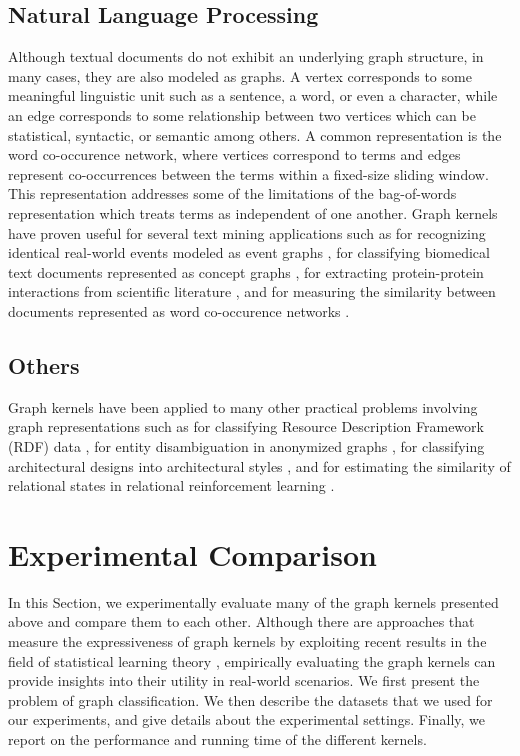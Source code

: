 \documentclass[twoside,11pt]{article}
\begin{document}
\subsection{Natural Language Processing}
Although textual documents do not exhibit an underlying graph structure, in many cases, they are also modeled as graphs.
A vertex corresponds to some meaningful linguistic unit such as a sentence, a word, or even a character, while an edge corresponds to some relationship between two vertices which can be statistical, syntactic, or semantic among others.
A common representation is the word co-occurence network, where vertices correspond to terms and edges represent co-occurrences between the terms within a fixed-size sliding window.
This representation addresses some of the limitations of the bag-of-words representation which treats terms as independent of one another.
Graph kernels have proven useful for several text mining applications such as for recognizing identical real-world events modeled as event graphs \cite{glavavs2013recognizing}, for classifying biomedical text documents represented as concept graphs \cite{bleik2013text}, for extracting protein-protein interactions from scientific literature \cite{airola2008graph,airola2008all}, and for measuring the similarity between documents represented as word co-occurence networks \cite{nikolentzos2017shortest}.


\subsection{Others}
Graph kernels have been applied to many other practical problems involving graph representations such as for classifying Resource Description Framework (RDF) data \cite{losch2012graph,de2015substructure}, for entity disambiguation in anonymized graphs \cite{hermansson2013entity}, for classifying architectural designs into architectural styles \cite{strobbe2016automatic}, and for estimating the similarity of relational states in relational reinforcement learning \cite{driessens2006graph,halbritter2007learning}.


\section{Experimental Comparison}\label{sec:experiments}
In this Section, we experimentally evaluate many of the graph kernels presented above and compare them to each other.
Although there are approaches that measure the expressiveness of graph kernels by exploiting recent results in the field of statistical learning theory \cite{oneto2017measuring}, empirically evaluating the graph kernels can provide insights into their utility in real-world scenarios.
We first present the problem of graph classification.
We then describe the datasets that we used for our experiments, and give details about the experimental settings.
Finally, we report on the performance and running time of the different kernels.
\end{document}
